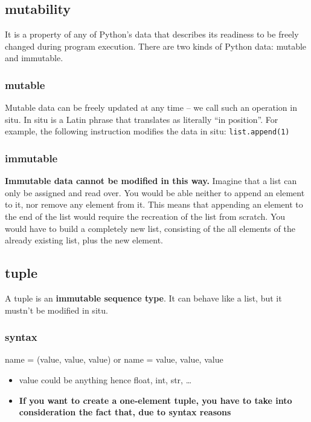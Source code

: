 \documentclass[11pt]{article}
\begin{document}
\subsection{mutability}
\label{sec:org99ae8c0}
It is a property of any of Python’s data that describes its readiness to
be freely changed during program execution. There are two kinds of
Python data: mutable and immutable.

\subsubsection{mutable}
\label{sec:orge2b0803}
Mutable data can be freely updated at any time – we call such an
operation in situ. In situ is a Latin phrase that translates as
literally “in position”. For example, the following instruction
modifies the data in situ: \texttt{list.append(1)}

\subsubsection{immutable}
\label{sec:orgc124ca4}
\textbf{Immutable data cannot be modified in this way.} Imagine that a list can
only be assigned and read over. You would be able neither to append an
element to it, nor remove any element from it. This means that
appending an element to the end of the list would require the
recreation of the list from scratch. You would have to build a
completely new list, consisting of the all elements of the already
existing list, plus the new element.
\subsection{tuple}
\label{sec:org715ca01}
A tuple is an \textbf{immutable sequence type}. It can behave like a list, but
it mustn’t be modified in situ.

\subsubsection{syntax}
\label{sec:org280d02d}
name = (value, value, value)
or
name = value, value, value

\begin{itemize}
\item value could be anything hence float, int, str, \ldots{}
\item \textbf{If you want to create a one-element tuple, you have to take into
consideration the fact that, due to syntax reasons}
\end{itemize}
\end{document}
